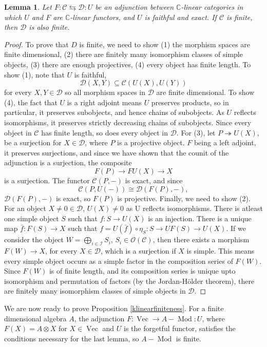 \documentclass[11pt]{book}
\newtheorem{Lem}[theorem]{Lemma}
\theoremstyle{Rem}
\theoremstyle{definition}
\numberwithin{equation}{section}
\newcommand\Vect{\operatorname{Vec}}
\newcommand\Mod{\operatorname{Mod}}
\newcommand\kk{\mathbb C}
\newcommand\C{\mathcal C}
\newcommand\OO{\mathcal O}
\newcommand\D{\mathcal D}
\newcommand \I{\mathcal I }
\begin{document}
\begin{Lem}
Let $F:\C \leftrightarrows  \D : U$ be an adjunction between $\kk$-linear categories in which $U$ and $F$ are $\kk$-linear functors, and $U$ is faithful and exact. If $\C$ is finite, then $\D$ is also finite.
\end{Lem}
\begin{proof}
To prove that $D$ is finite, we need to show (1) the morphism spaces are finite dimensional, (2) there are finitely many isomorphism classes of simple objects, (3) there are enough projectives, (4) every object has finite length.
To show (1), note that $U$ is faithful, \begin{equation}
	\D(X, Y) \subseteq \C(U(X), U(Y))
\end{equation} for every $X,Y \in \D$ so all morphism spaces in $\D$ are finite dimensional. To show (4), the fact that $U$ is a right adjoint means $U$ preserves products, so in particular, it preserves subobjects, and hence chains of subobjects. As $U$ reflects isomorphisms, it preserves strictly decreasing chains of subobjects. Since every object in $\C$ has finite length, so does every object in $\D$. For (3), let $P \twoheadrightarrow U(X)$, be a surjection for $X\in \D$, where $P$ is a projective object. $F$ being a left adjoint, it preserves surjections, and since we have shown that the counit of the adjunction is a surjection, the composite \begin{equation}
	F(P) \rightarrow FU(X)\rightarrow X
\end{equation}
is a surjection. The functor $\C(P, -)$ is exact, and since \begin{equation}
	\C(P, U(-)) \cong \D(F(P), -), 
\end{equation}
$\D(F(P), -)$ is exact, so $F(P)$ is projective. Finally, we need to show (2). For an object $X\neq 0 \in \D$, $U(X)\neq 0$ as U reflects isomorphisms. There is atleast one simple object $S$ such that $f:S\rightarrow U(X)$ is an injection. There is a unique map $\bar{f}:F(S) \rightarrow X$ such that $f = U(\bar{f})\circ\eta_S: S\rightarrow UF(S) \rightarrow U(X)$. If we consider the object $W= \bigoplus_{i\in \I} S_i$, $ S_i\in \OO(\C)$, then there exists a morphism $F(W) \rightarrow X$, for every $X\in \D$, which is a surjection if $X$ is simple. This means every simple object occurs as a simple factor in the composition series of $F(W)$. Since $F(W)$ is of finite length, and its composition series is unique upto isomorphism and permutation of factors (by the Jordan-H\"older theorem), there are finitely many isomorphism classes of simple objects in $\D$.      
\end{proof}
We are now ready to prove Proposition \ref{klinearfiniteness}. For a finite dimensional algebra $A$, the adjunction $F:\Vect \rightarrow A-\Mod: U$, where $F(X) = A\otimes X$ for $X\in \Vect$ and $U$ is the forgetful functor, satisfies the conditions necessary for the last lemma, so $A-\Mod$ is finite.
\end{document}
